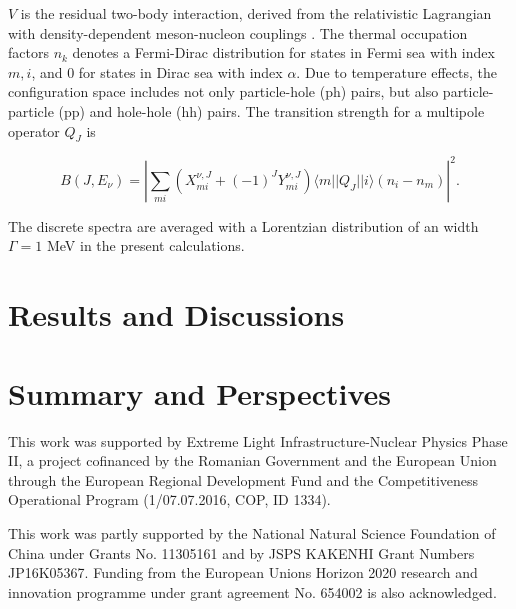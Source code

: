 \documentclass[prc,twocolumn,twoside,showpacs,superscriptaddress,floatfix]{revtex4-1}
\begin{document}
$V$ is the residual two-body interaction, derived from the relativistic
Lagrangian with  density-dependent meson-nucleon couplings \cite{Niksic}. The
thermal occupation factors $n_k$ denotes a Fermi-Dirac distribution for states
in Fermi sea with index $m,i$, and $0$ for states in Dirac sea with index
$\alpha$. Due to temperature effects, the configuration space includes not only
particle-hole (ph) pairs, but also particle-particle (pp) and hole-hole (hh)
pairs. The transition strength for a multipole operator $Q_J$ is

\begin{equation}
   B(J,E_\nu) = \left | \sum_{mi} (X^{\nu,J}_{mi} +
   (-1)^J Y^{\nu,J}_{mi} ) \langle m || Q_J || i\rangle (n_i
   -n_m) \right |^2.
\end{equation}

The discrete spectra are averaged with a Lorentzian distribution of an width
$\Gamma = 1 $ MeV in the present calculations.




\section{Results and Discussions}\label{results}


\section{Summary and Perspectives}\label{summary}

{}

This work was supported by Extreme Light Infrastructure-Nuclear
Physics Phase II, a project cofinanced by the Romanian Government
and the European Union through the European Regional Development
Fund and the Competitiveness Operational Program (1/07.07.2016,
COP, ID 1334).

This work was partly supported by the National Natural Science Foundation of China
under Grants No. 11305161 and by JSPS KAKENHI Grant Numbers JP16K05367.
Funding from the European Unions Horizon 2020 research and innovation
programme under grant agreement No. 654002 is also
acknowledged.


\end{document}
